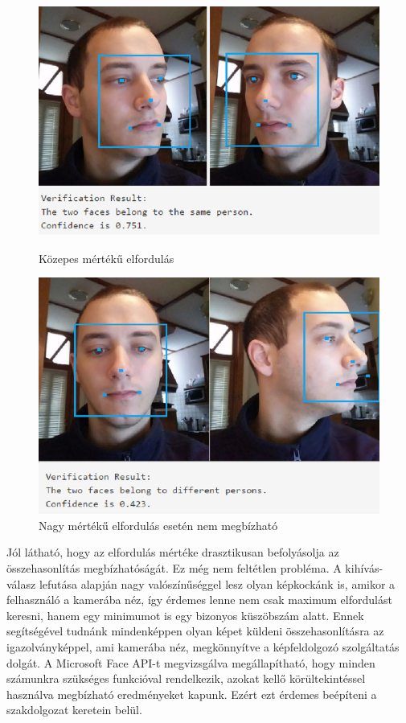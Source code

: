 \begin{figure}[h]
 \begin{minipage}{.5\textwidth} 
\centering
    \includegraphics[scale=0.3]{img/mpo_compare}
    \caption{Közepes mértékű elfordulás}
 \end{minipage}
 \begin{minipage}{.5\textwidth} 
\centering
     \includegraphics[scale=0.3]{img/mpo_compare_failed}
     \caption{Nagy mértékű elfordulás esetén nem megbízható}
 \end{minipage}
\end{figure}

Jól látható, hogy az elfordulás mértéke drasztikusan befolyásolja az összehasonlítás megbízhatóságát. Ez még nem feltétlen probléma. A kihívás-válasz lefutása alapján nagy valószínűséggel lesz olyan képkockánk is, amikor a felhasználó a kamerába néz, így érdemes lenne nem csak maximum elfordulást keresni, hanem egy minimumot is egy bizonyos küszöbszám alatt. Ennek segítségével tudnánk mindenképpen olyan képet küldeni összehasonlításra az igazolványképpel, ami kamerába néz, megkönnyítve a képfeldolgozó szolgáltatás dolgát.
A Microsoft Face API-t megvizsgálva megállapítható, hogy minden számunkra szükséges funkcióval rendelkezik, azokat kellő körültekintéssel használva megbízható eredményeket kapunk. Ezért ezt érdemes beépíteni a szakdolgozat keretein belül.

